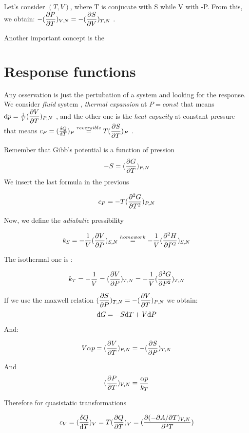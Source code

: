 \documentclass[../main/main.tex]{subfiles}
\begin{document}
Let's consider \( (T,V) \), where T is conjucate with S while V with -P. From this, we obtain:
\( -(\displaystyle \frac{\partial P}{\partial T})_{V,N} = - (\displaystyle \frac{\partial S}{\partial V} )_{T,N}  \) .

Another important concept is the
\section{Response functions}
Any osservation is just the pertubation of a system and looking for the response.
We consider \emph{fluid} system , \emph{thermal expansion} at $P = const$ that means \( \mathrm{d}{p} = \frac{1}{V}(\displaystyle \frac{\partial V}{\partial T} )_{P,N} \) , and the other one is the \emph{heat capacity} at constant pressure that means \( c_P = (\frac{\delta Q}{\mathrm{d}{T}})_P \overset{reversible}{=} T (\displaystyle \frac{\partial S}{\partial T} )_P \) .

Remember that Gibb's potential is a function of pression
\[ -S = (\displaystyle \frac{\partial G}{\partial T} )_{P,N} \]
We insert the last formula in the previous

\[  c_P = -T (\displaystyle \frac{\partial^{2} G}{\partial T^{2} } )_{P,N} \]

Now, we define the \emph{adiabatic}  pressibility

\[ k_S = - \frac{1}{V}(\displaystyle \frac{\partial V}{\partial P} )_{S,N} \overset{homework}{=} - \frac{1}{V} (\displaystyle \frac{\partial^{2} H}{\partial P^{2} } )_{S,N} \]

The isothermal one is :

\[ k_T = - \frac{1}{V} = ( \displaystyle \frac{\partial V}{\partial P} )_{T,N} = - \frac{1}{V} (\displaystyle \frac{\partial^{2} G}{\partial P^{2} } )_{T,N}  \]

If we use the maxwell relation \( (\displaystyle \frac{\partial S}{\partial P} )_{T,N} = - (\displaystyle \frac{\partial V}{\partial T} )_{P,N} \)
we obtain:
\begin{equation}
  \mathrm{d}{G} = - S \mathrm{d}{T} + V \mathrm{d}{P}
  \label{eq:}
\end{equation}

And:

\begin{equation}
  V \alpha p = (\displaystyle \frac{\partial V}{\partial T} )_{P,N} = - (\displaystyle \frac{\partial S}{\partial P} )_{T,N}
  \label{eq:}
\end{equation}

And
\begin{equation}
  (\displaystyle \frac{\partial P}{\partial T} )_{V,N} = \frac{\alpha p}{k_T}
  \label{eq:}
\end{equation}

Therefore for quasistatic transformations

\begin{equation}
  c_V = ( \frac{ \delta Q }{ \mathrm{d}{T}})_V = T (\displaystyle \frac{\partial Q}{\partial T} )_V = ( \frac{ \partial ( -\partial A / \partial T )_{V,N}}{\partial^2 T})
  \label{eq:}
\end{equation}
\end{document}
